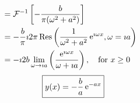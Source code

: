 {\begin{Solution}
\begin{enumerate}
\begin{align*}
      \\
      &= \mathcal{F}^{-1} \left[ -\frac{b}{\pi (\omega^2 + a^2)} \right] 
      \\
      &= - \frac{b}{\pi} \imath 2 \pi \mathop{\mathrm{Res}}\nolimits \left( \frac{1}{\omega^2 + a^2}
        \mathop{\mathrm{e}}\nolimits^{\imath \omega x}, \omega = \imath a \right) 
      \\
      &= - \imath 2 b \lim_{\omega \to \imath a} \left( \frac{\mathop{\mathrm{e}}\nolimits^{\imath \omega x}}{\omega + \imath a} \right), 
      \quad \mathrm{for}\ x \geq 0
    \end{align*}
    \[
    \boxed{
      y(x) = - \frac{b}{a} \mathop{\mathrm{e}}\nolimits^{-a x}
      }
    \]
  \end{enumerate}
\end{Solution}









}
